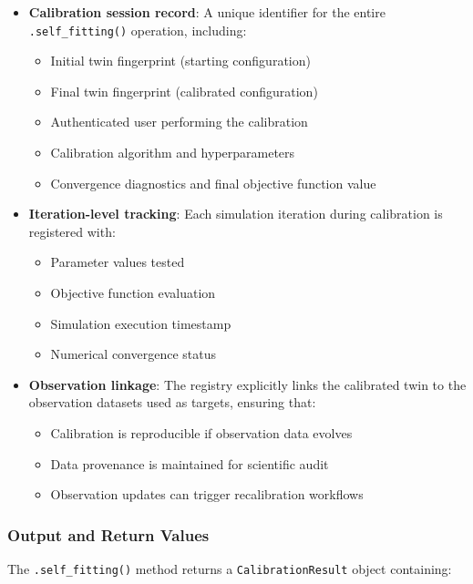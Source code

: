 \begin{itemize}
\item \textbf{Calibration session record}: A unique identifier for the entire \texttt{.self\_fitting()} operation, including:
\begin{itemize}
    \item Initial twin fingerprint (starting configuration)
    \item Final twin fingerprint (calibrated configuration)
    \item Authenticated user performing the calibration
    \item Calibration algorithm and hyperparameters
    \item Convergence diagnostics and final objective function value
\end{itemize}

\item \textbf{Iteration-level tracking}: Each simulation iteration during calibration is registered with:
\begin{itemize}
    \item Parameter values tested
    \item Objective function evaluation
    \item Simulation execution timestamp
    \item Numerical convergence status
\end{itemize}

\item \textbf{Observation linkage}: The registry explicitly links the calibrated twin to the observation datasets used as targets, ensuring that:
\begin{itemize}
    \item Calibration is reproducible if observation data evolves
    \item Data provenance is maintained for scientific audit
    \item Observation updates can trigger recalibration workflows
\end{itemize}
\end{itemize}

\subsubsection{Output and Return Values}

The \texttt{.self\_fitting()} method returns a \texttt{CalibrationResult} object containing:

